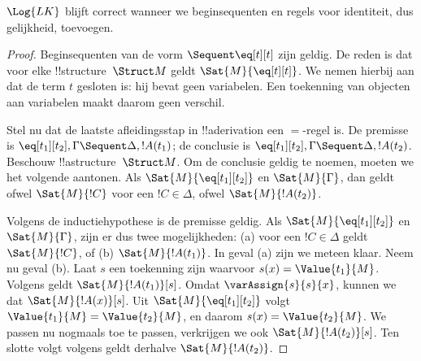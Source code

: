 \documentclass[openany]{memoir}
\begin{document}


\begin{prop}
$\Log{LK}$ blijft correct wanneer we beginsequenten en regels voor
identiteit, dus gelijkheid, toevoegen.
\end{prop}

\begin{proof}
Beginsequenten van de vorm ${} \Sequent \eq[t][t]$ zijn geldig. De
reden is dat voor elke !!{structure}~$\Struct M$ geldt
$\Sat{M}{\eq[t][t]}$. We nemen hierbij aan dat de term $t$ gesloten is:
hij bevat geen variabelen. Een toekenning van objecten aan variabelen
maakt daarom geen verschil.

Stel nu dat de laatste afleidingsstap in !!a{derivation} een $=$-regel
is. De premisse is $\eq[t_1][t_2], \Gamma \Sequent \Delta, !A(t_1)$;
de conclusie is $\eq[t_1][t_2], \Gamma \Sequent \Delta, !A(t_2)$.
Beschouw !!a{structure}~$\Struct M$. Om de conclusie geldig te noemen,
moeten we het volgende aantonen. Als $\Sat{M}{\eq[t_1][t_2]}$ en
$\Sat{M}{\Gamma}$, dan geldt ofwel $\Sat{M}{!C}$ voor een $!C \in
\Delta$, ofwel $\Sat{M}{!A(t_2)}$.

Volgens de inductiehypothese is de premisse geldig. Als
$\Sat{M}{\eq[t_1][t_2]}$ en $\Sat{M}{\Gamma}$, zijn er dus twee
mogelijkheden: (a) voor een $!C \in \Delta$ geldt $\Sat{M}{!C}$, of
(b) $\Sat{M}{!A(t_1)}$. In geval (a) zijn we meteen klaar. Neem nu
geval (b). Laat $s$ een toekenning zijn waarvoor
$s(x) = \Value{t_1}{M}$. Volgens
 geldt
$\Sat{M}{!A(t_1)}[s]$. Omdat $\varAssign{s}{s}{x}$, kunnen we
 dat $\Sat{M}{!A(x)}[s]$. Uit
$\Sat{M}{\eq[t_1][t_2]}$ volgt $\Value{t_1}{M} = \Value{t_2}{M}$, en
daarom $s(x) = \Value{t_2}{M}$. We passen nu
 nogmaals toe te passen, verkrijgen
we ook $\Sat{M}{!A(t_2)}[s]$. Ten slotte volgt volgens
 geldt derhalve
$\Sat{M}{!A(t_2)}$.
\end{proof}
\endgroup
\OLEndChapterHook

\begingroup
\def\olfilename{OLP-0084}
\def\olfilepath{content/first-order-logic/natural-deduction/}
\hypertarget{unit-OLP-0084}{}
\end{document}
